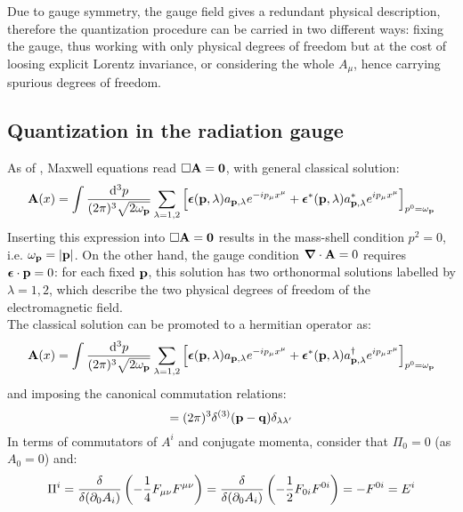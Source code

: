 Due to gauge symmetry, the gauge field gives a redundant physical description, therefore the quantization procedure can be carried in two different ways: fixing the gauge, thus working with only physical degrees of freedom but at the cost of loosing explicit Lorentz invariance, or considering the whole $ A_\mu $, hence carrying spurious degrees of freedom.

\subsection{Quantization in the radiation gauge}

As of , Maxwell equations  read $ \Box \mathbf{A} = \mathbf{0} $, with general classical solution:
\begin{equation*}
  \mathbf{A}(x) = \int \frac{\mathrm{d}^3p}{(2\pi)^3 \sqrt{2\omega_{\mathbf{p}}}} \sum_{\lambda = 1,2} \left[ \boldsymbol{\epsilon}(\mathbf{p},\lambda) a_{\mathbf{p},\lambda} e^{-i p_\mu x^\mu} + \boldsymbol{\epsilon}^*(\mathbf{p},\lambda)a^*_{\mathbf{p},\lambda} e^{i p_\mu x^\mu} \right]_{p^0 = \omega_{\mathbf{p}}}
\end{equation*}
Inserting this expression into $ \Box \mathbf{A} = \mathbf{0} $ results in the mass-shell condition $ p^2 = 0 $, i.e. $ \omega_{\mathbf{p}} = \left\lvert\mathbf{p}\right\rvert $. On the other hand, the gauge condition $ \boldsymbol{\nabla}\cdot \mathbf{A} = 0 $ requires $ \boldsymbol{\epsilon} \cdot \mathbf{p} = 0 $: for each fixed $ \mathbf{p} $, this solution has two orthonormal solutions labelled by $ \lambda = 1,2 $, which describe the two physical degrees of freedom of the electromagnetic field. \\
The classical solution can be promoted to a hermitian operator as:
\begin{equation}
  \mathbf{A}(x) = \int \frac{\mathrm{d}^3p}{(2\pi)^3 \sqrt{2\omega_{\mathbf{p}}}} \sum_{\lambda = 1,2} \left[ \boldsymbol{\epsilon}(\mathbf{p},\lambda) a_{\mathbf{p},\lambda} e^{-i p_\mu x^\mu} + \boldsymbol{\epsilon}^*(\mathbf{p},\lambda)a^\dagger_{\mathbf{p},\lambda} e^{i p_\mu x^\mu} \right]_{p^0 = \omega_{\mathbf{p}}}
\end{equation}
and imposing the canonical commutation relations:
\begin{equation}
  [a_{\ve{p},\lambda} , a_{\ve{q},\lambda'}\dg] = (2\pi)^3 \delta^{(3)}(\ve{p} - \ve{q}) \delta_{\lambda \lambda'}
\end{equation}
In terms of commutators of $ A^i $ and conjugate momenta, consider that $ \Pi_0 = 0 $ (as $ A_0 = 0 $) and\footnotemark:
\begin{equation*}
  \Pi^i = \frac{\delta}{\delta(\partial_0 A_i)} \left( -\frac{1}{4} F_{\mu \nu} F^{\mu \nu} \right) = \frac{\delta}{\delta(\partial_0 A_i)} \left( -\frac{1}{2} F_{0i} F^{0i} \right) = - F^{0i} = E^i
\end{equation*}
